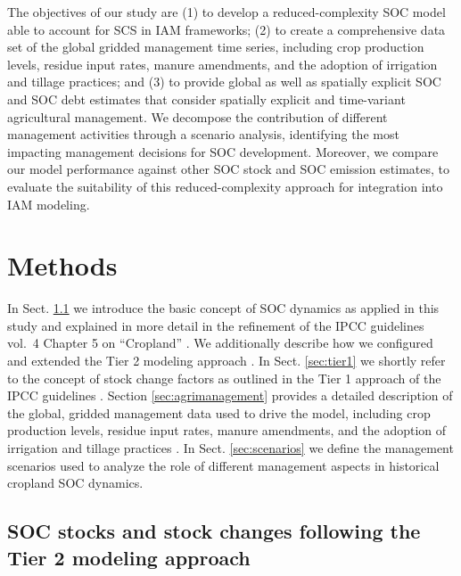 \documentclass[gc, manuscript]{copernicus}
\begin{document}
The objectives of our study are (1) to develop a reduced-complexity SOC model able to account for SCS in IAM frameworks; (2) to create a comprehensive data set of the global gridded management time series, including crop production levels, residue input rates, manure amendments, and the adoption of irrigation and tillage practices; and (3) to provide global as well as spatially explicit SOC and SOC debt estimates that consider spatially explicit and time-variant agricultural management.
We decompose the contribution of different management activities through a scenario analysis, identifying the most impacting management decisions for SOC development. Moreover, we compare our model performance against other SOC stock and SOC emission estimates, to evaluate the suitability of this reduced-complexity approach for integration into IAM modeling.
\newpage

\hypertarget{methods}{%
\section{Methods}\label{methods}}

In Sect. \ref{sec:carbonbudget} we introduce the basic concept of SOC dynamics as applied in this study and explained in more detail in the refinement of the IPCC guidelines vol.~4 Chapter 5 on ``Cropland'' \citep{ogle_cropland_in_ipcc_2019}. We additionally describe how we configured and extended the Tier 2 modeling approach \citep[for model code see][]{karstens_mrsoil_2020}. In Sect. \ref{sec:tier1} we shortly refer to the concept of stock change factors as outlined in the Tier 1 approach of the IPCC guidelines \citep{eggleston_ipcc_2006, calvo_buendia_ipcc_2019}.
Section \ref{sec:agrimanagement} provides a detailed description of the global, gridded management data used to drive the model, including crop production levels, residue input rates, manure amendments, and the adoption of irrigation and tillage practices \citep[for model code see][]{bodirsky_mrcommons_2020}. In Sect. \ref{sec:scenarios} we define the management scenarios used to analyze the role of different management aspects in historical cropland SOC dynamics.

\hypertarget{sec:carbonbudget}{%
\subsection{SOC stocks and stock changes following the Tier 2 modeling approach}\label{sec:carbonbudget}}
\end{document}

